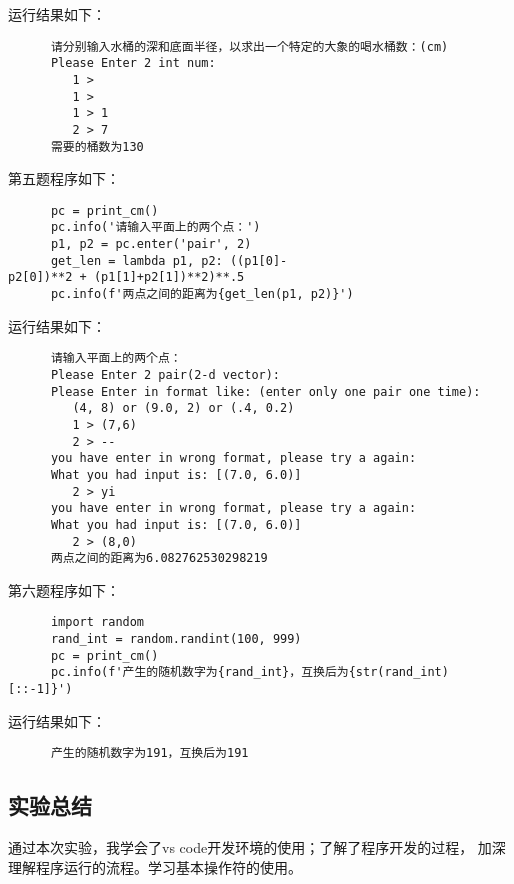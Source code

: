 \documentclass[a4paper]{ctexart}
\begin{document}
         运行结果如下：
      \begin{verbatim}
      请分别输入水桶的深和底面半径，以求出一个特定的大象的喝水桶数：(cm)
      Please Enter 2 int num:
         1 > 
         1 > 
         1 > 1
         2 > 7
      需要的桶数为130
      \end{verbatim}

         第五题程序如下：
      \begin{verbatim}
      pc = print_cm()
      pc.info('请输入平面上的两个点：')
      p1, p2 = pc.enter('pair', 2)
      get_len = lambda p1, p2: ((p1[0]-p2[0])**2 + (p1[1]+p2[1])**2)**.5
      pc.info(f'两点之间的距离为{get_len(p1, p2)}')
      \end{verbatim}

         运行结果如下：
      \begin{verbatim}
      请输入平面上的两个点：
      Please Enter 2 pair(2-d vector):
      Please Enter in format like: (enter only one pair one time):
         (4, 8) or (9.0, 2) or (.4, 0.2)
         1 > (7,6)
         2 > --
      you have enter in wrong format, please try a again:
      What you had input is: [(7.0, 6.0)]
         2 > yi
      you have enter in wrong format, please try a again:
      What you had input is: [(7.0, 6.0)]
         2 > (8,0)
      两点之间的距离为6.082762530298219 
      \end{verbatim}

         第六题程序如下：
      \begin{verbatim}
      import random
      rand_int = random.randint(100, 999)
      pc = print_cm()
      pc.info(f'产生的随机数字为{rand_int}，互换后为{str(rand_int)[::-1]}')
      \end{verbatim}

         运行结果如下：
      \begin{verbatim}
      产生的随机数字为191，互换后为191 
      \end{verbatim}

   \subsection{实验总结}
      通过本次实验，我学会了vs code开发环境的使用；了解了程序开发的过程，%
      加深理解程序运行的流程。学习基本操作符的使用。
\end{document}
